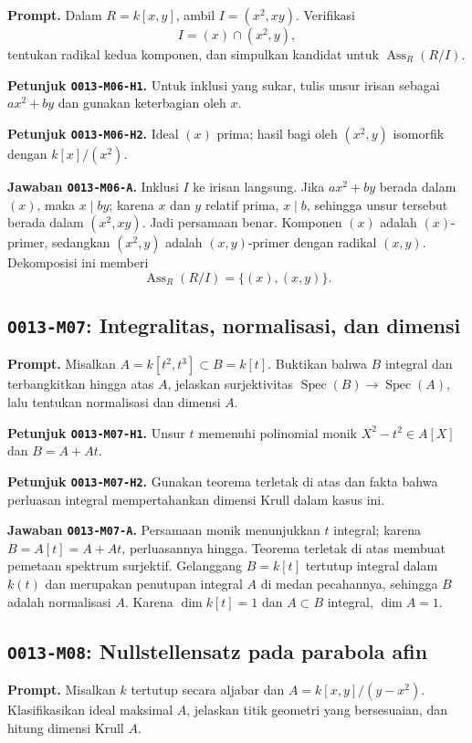 \documentclass[11pt,a4paper]{article}
\newcommand{\oid}[1]{\texttt{#1}}
\begin{document}
\textbf{Prompt.} Dalam $R=k[x,y]$, ambil $I=(x^2,xy)$. Verifikasi
\[
I=(x)\cap(x^2,y),
\]
tentukan radikal kedua komponen, dan simpulkan kandidat untuk
$\operatorname{Ass}_R(R/I)$.

\textbf{Petunjuk \oid{O013-M06-H1}.} Untuk inklusi yang sukar, tulis unsur
irisan sebagai $ax^2+by$ dan gunakan keterbagian oleh $x$.

\textbf{Petunjuk \oid{O013-M06-H2}.} Ideal $(x)$ prima; hasil bagi oleh
$(x^2,y)$ isomorfik dengan $k[x]/(x^2)$.

\textbf{Jawaban \oid{O013-M06-A}.} Inklusi $I$ ke irisan langsung. Jika
$ax^2+by$ berada dalam $(x)$, maka $x\mid by$; karena $x$ dan $y$ relatif
prima, $x\mid b$, sehingga unsur tersebut berada dalam $(x^2,xy)$. Jadi
persamaan benar. Komponen $(x)$ adalah $(x)$-primer, sedangkan $(x^2,y)$
adalah $(x,y)$-primer dengan radikal $(x,y)$. Dekomposisi ini memberi
\[
\operatorname{Ass}_R(R/I)=\{(x),(x,y)\}.
\]

\subsection*{\oid{O013-M07}: Integralitas, normalisasi, dan dimensi}

\textbf{Prompt.} Misalkan $A=k[t^2,t^3]\subset B=k[t]$. Buktikan bahwa
$B$ integral dan terbangkitkan hingga atas $A$, jelaskan surjektivitas
$\operatorname{Spec}(B)\to\operatorname{Spec}(A)$, lalu tentukan normalisasi
dan dimensi $A$.

\textbf{Petunjuk \oid{O013-M07-H1}.} Unsur $t$ memenuhi polinomial monik
$X^2-t^2\in A[X]$ dan $B=A+At$.

\textbf{Petunjuk \oid{O013-M07-H2}.} Gunakan teorema terletak di atas dan
fakta bahwa perluasan integral mempertahankan dimensi Krull dalam kasus ini.

\textbf{Jawaban \oid{O013-M07-A}.} Persamaan monik menunjukkan $t$ integral;
karena $B=A[t]=A+At$, perluasannya hingga. Teorema terletak di atas membuat
pemetaan spektrum surjektif. Gelanggang $B=k[t]$ tertutup integral dalam
$k(t)$ dan merupakan penutupan integral $A$ di medan pecahannya, sehingga
$B$ adalah normalisasi $A$. Karena $\dim k[t]=1$ dan $A\subset B$ integral,
$\dim A=1$.

\subsection*{\oid{O013-M08}: Nullstellensatz pada parabola afin}

\textbf{Prompt.} Misalkan $k$ tertutup secara aljabar dan
$A=k[x,y]/(y-x^2)$. Klasifikasikan ideal maksimal $A$, jelaskan titik geometri
yang bersesuaian, dan hitung dimensi Krull $A$.
\end{document}

